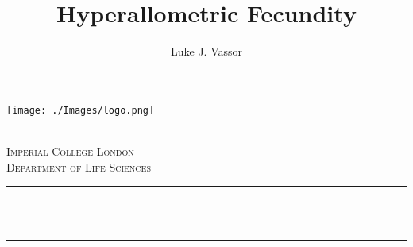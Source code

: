 \documentclass[a4paper, twoside]{report}
\title{Hyperallometric Fecundity}
\author{Luke J. Vassor}
\begin{document}
\begin{titlepage}

    \newcommand{\HRule}{\rule{\linewidth}{0.5mm}} %
    
    
    \texttt{[image: ./Images/logo.png]}\\[1cm] %
     
    
    \center %
    
    \quad\\[1.5cm]
    \textsc{\Large Imperial College London}\\[0.5cm] %
    \textsc{\large Department of Life Sciences}\\[0.5cm] %
    
    \makeatletter
    \HRule \\[0.4cm]
    { \huge \bfseries \@title}\\[0.4cm] %
    \HRule \\[1.5cm]
     
    

\end{titlepage}
\end{document}
